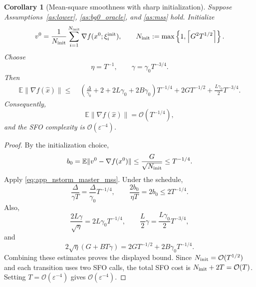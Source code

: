 \documentclass[letter,11pt]{article}
\newtheorem{corollary}{Corollary}[theorem]
\newcommand{\E}{\mathbb{E}}
\newcommand{\Ocal}{\mathcal{O}}
\begin{document}
\begin{corollary}[Mean-square smoothness with sharp initialization]
\label{cor:app_nstorm_mss}
Suppose Assumptions~\ref{as:lower}, \ref{as:bg0_oracle}, and
\ref{as:mss} hold. Initialize
\[
    v^0
    =
    \frac1{N_{\rm init}}
    \sum_{i=1}^{N_{\rm init}}\nabla f(x^0;\xi_i^{\rm init}),
    \qquad
    N_{\rm init}
    :=
    \max\left\{
        1,\left\lceil G^2T^{1/2}\right\rceil
    \right\}.
\]
Choose
\[
    \eta=T^{-1},
    \qquad
    \gamma=\gamma_0T^{-3/4}.
\]
Then
\[
\begin{aligned}
\E\|\nabla f(\widehat x)\|
\le\;&
\left(
    \frac{\Delta}{\gamma_0}
    +2
    +2L\gamma_0
    +2B\gamma_0
\right)T^{-1/4}
+
2GT^{-1/2}
+
\frac{L\gamma_0}{2}T^{-3/4}.
\end{aligned}
\]
Consequently,
\[
    \E\|\nabla f(\widehat x)\|
    =
    \Ocal(T^{-1/4}),
\]
and the SFO complexity is \(\Ocal(\varepsilon^{-4})\).
\end{corollary}

\begin{proof}
By the initialization choice,
\[
    b_0
    =
    \E\|v^0-\nabla f(x^0)\|
    \le
    \frac{G}{\sqrt{N_{\rm init}}}
    \le
    T^{-1/4}.
\]
Apply \eqref{eq:app_nstorm_master_mss}. Under the schedule,
\[
    \frac{\Delta}{\gamma T}
    =
    \frac{\Delta}{\gamma_0}T^{-1/4},
    \qquad
    \frac{2b_0}{\eta T}
    =
    2b_0
    \le
    2T^{-1/4}.
\]
Also,
\[
    \frac{2L\gamma}{\sqrt\eta}
    =
    2L\gamma_0T^{-1/4},
    \qquad
    \frac{L}{2}\gamma
    =
    \frac{L\gamma_0}{2}T^{-3/4},
\]
and
\[
    2\sqrt\eta(G+BT\gamma)
    =
    2GT^{-1/2}
    +
    2B\gamma_0T^{-1/4}.
\]
Combining these estimates proves the displayed bound. Since
\(N_{\rm init}=\Ocal(T^{1/2})\) and each transition uses two SFO calls, the
total SFO cost is \(N_{\rm init}+2T=\Ocal(T)\). Setting
\(T=\Ocal(\varepsilon^{-4})\) gives \(\Ocal(\varepsilon^{-4})\).
\end{proof}
\end{document}
